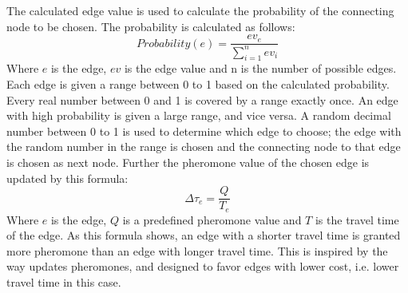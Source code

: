 The calculated edge value is used to calculate the probability of the connecting node to be chosen. The probability is calculated as follows:
\newline
$$Probability(e) = \frac{ev_e}{\sum\limits^{n}_{i=1}ev_i}$$
\newline
Where $e$ is the edge, $ev$ is the edge value and n is the number of possible edges. Each edge is given a range between 0 to 1 based on the calculated probability. Every real number between 0 and 1 is covered by a range exactly once. An edge with high probability is given a large range, and vice versa. A random decimal number between 0 to 1 is used to determine which edge to choose; the edge with the random number in the range is chosen and the connecting node to that edge is chosen as next node. Further the pheromone value of the chosen edge is updated by this formula:
\newline
$$\Delta \tau_{e} = \frac{Q}{T_e}$$ 
\newline
Where $e$ is the edge, $Q$ is a predefined pheromone value and $T$ is the travel time of the edge. As this formula shows, an edge with a shorter travel time is granted more pheromone than an edge with longer travel time. This is inspired by the way \citet{hsiao04} updates pheromones, and designed to favor edges with lower cost, i.e. lower travel time in this case. 